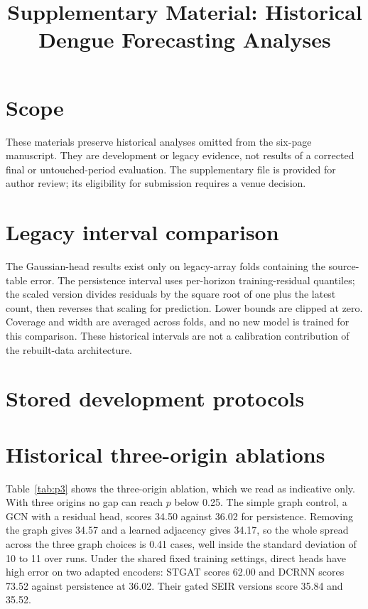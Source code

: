 \documentclass[conference]{IEEEtran}
\begin{document}
\title{Supplementary Material: Historical Dengue Forecasting Analyses}
\author{}
\maketitle

\section{Scope}
These materials preserve historical analyses omitted from the six-page manuscript.
They are development or legacy evidence, not results of a corrected final or untouched-period evaluation.
The supplementary file is provided for author review; its eligibility for submission requires a venue decision.

\section{Legacy interval comparison}
The Gaussian-head results exist only on legacy-array folds containing the source-table error.
The persistence interval uses per-horizon training-residual quantiles; the scaled version divides residuals by the square root of one plus the latest count, then reverses that scaling for prediction.
Lower bounds are clipped at zero.
Coverage and width are averaged across folds, and no new model is trained for this comparison.
These historical intervals are not a calibration contribution of the rebuilt-data architecture.


\section{Stored development protocols}

\section{Historical three-origin ablations}
Table~\ref{tab:p3} shows the three-origin ablation, which we read as indicative only.
With three origins no gap can reach $p$ below 0.25. %
The simple graph control, a GCN with a residual head, scores 34.50 against 36.02 for persistence. %
Removing the graph gives 34.57 and a learned adjacency gives 34.17, so the whole spread across the three graph choices is 0.41 cases, well inside the standard deviation of 10 to 11 over runs. %
Under the shared fixed training settings, direct heads have high error on two adapted encoders: STGAT scores 62.00 and DCRNN scores 73.52 against persistence at 36.02. %
Their gated SEIR versions score 35.84 and 35.52. %
\end{document}
